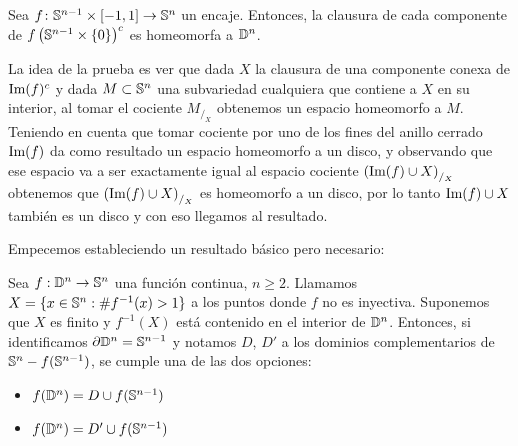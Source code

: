 \begin{teo*}\label{teo schoenflies}
    Sea $f\colon\mathbb{S}^{n-1}\times [-1,1]\to\mathbb{S}^n$ un encaje. Entonces, la clausura de cada componente de $f\left(\mathbb{S}^{n-1}\times \{0\}\right)^c$ es homeomorfa a $\mathbb{D}^n$.
\end{teo*}

La idea de la prueba es ver que dada $X$ la clausura de una componente conexa de $\text{Im}(f)^c$ y dada $M\subset\mathbb{S}^n$ una subvariedad cualquiera que contiene a $X$ en su interior, al tomar el cociente $M_{/_{X}}$ obtenemos un espacio homeomorfo a $M$. Teniendo en cuenta que tomar cociente por uno de los fines del anillo cerrado $\text{Im}(f)$ da como resultado un espacio homeomorfo a un disco, y observando que ese espacio va a ser exactamente igual al espacio cociente $\left(\text{Im}(f)\cup X\right)_{/_{X}}$ obtenemos que $\left(\text{Im}(f)\cup X\right)_{/_{X}}$ es homeomorfo a un disco, por lo tanto $\text{Im}(f)\cup X$ también es un disco y con eso llegamos al resultado.


Empecemos estableciendo un resultado básico pero necesario:

\begin{lema}\label{lema1}
    Sea $f:\mathbb{D}^n\to \mathbb{S}^n$ una función continua, $n\geq 2$. Llamamos $X=\{x\in\mathbb{S}^n :\# f^{-1}(x)> 1\}$ a los puntos donde $f$ no es inyectiva. Suponemos que $X$ es finito y $f^{-1}(X)$ está contenido en el interior de $\mathbb{D}^n$. Entonces, si identificamos $\partial\mathbb{D}^n = \mathbb{S}^{n-1}$ y notamos $D$, $D'$ a los dominios complementarios de $\mathbb{S}^n-f(\mathbb{S}^{n-1})$, se cumple una de las dos opciones:

    \begin{itemize}
        \item $f(\mathbb{D}^n)=D\cup f(\mathbb{S}^{n-1})$
        \item $f(\mathbb{D}^n)=D'\cup f(\mathbb{S}^{n-1})$
    \end{itemize}
\end{lema}

